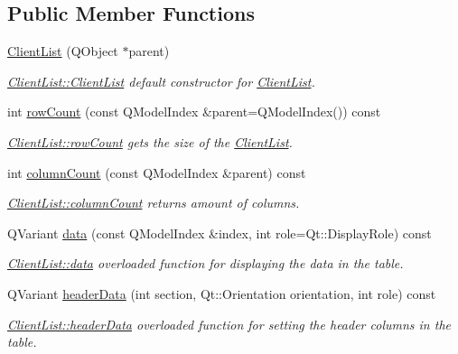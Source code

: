 \subsection*{Public Member Functions}
\begin{DoxyCompactItemize}
\item 
\hyperlink{class_client_list_ad4f58e11ef5596e0dd71b868abca2cf6}{Client\+List} (Q\+Object $\ast$parent)
\begin{DoxyCompactList}\small\item\em \hyperlink{class_client_list_ad4f58e11ef5596e0dd71b868abca2cf6}{Client\+List\+::\+Client\+List} default constructor for \hyperlink{class_client_list}{Client\+List}. \end{DoxyCompactList}\item 
int \hyperlink{class_client_list_a306db79684b007b939da193370127a8d}{row\+Count} (const Q\+Model\+Index \&parent=Q\+Model\+Index()) const 
\begin{DoxyCompactList}\small\item\em \hyperlink{class_client_list_a306db79684b007b939da193370127a8d}{Client\+List\+::row\+Count} gets the size of the \hyperlink{class_client_list}{Client\+List}. \end{DoxyCompactList}\item 
int \hyperlink{class_client_list_a115194990c4699f46982aa53d6ca47d6}{column\+Count} (const Q\+Model\+Index \&parent) const 
\begin{DoxyCompactList}\small\item\em \hyperlink{class_client_list_a115194990c4699f46982aa53d6ca47d6}{Client\+List\+::column\+Count} returns amount of columns. \end{DoxyCompactList}\item 
Q\+Variant \hyperlink{class_client_list_aaa358efb8aad0f61194d56fe6735b4b6}{data} (const Q\+Model\+Index \&index, int role=Qt\+::\+Display\+Role) const 
\begin{DoxyCompactList}\small\item\em \hyperlink{class_client_list_aaa358efb8aad0f61194d56fe6735b4b6}{Client\+List\+::data} overloaded function for displaying the data in the table. \end{DoxyCompactList}\item 
Q\+Variant \hyperlink{class_client_list_ab63f37df0e3889d22224bddac30b4add}{header\+Data} (int section, Qt\+::\+Orientation orientation, int role) const 
\begin{DoxyCompactList}\small\item\em \hyperlink{class_client_list_ab63f37df0e3889d22224bddac30b4add}{Client\+List\+::header\+Data} overloaded function for setting the header columns in the table. \end{DoxyCompactList}\item 

\end{DoxyCompactItemize}

